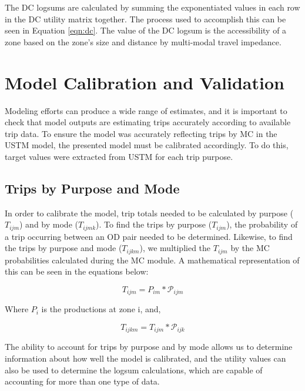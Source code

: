The DC logsums are calculated by summing the exponentiated values in each row in the DC utility matrix
together. The process used to accomplish this can be seen
in Equation \ref{eqn:dc}. The value of the DC logsum is the accessibility of
a zone based on the zone's size and distance by multi-modal travel impedance.


\section{Model Calibration and Validation}

Modeling efforts can produce a wide range of estimates, and it is important to
check that model outputs are estimating trips accurately according to available trip data.
To ensure the model was accurately reflecting trips by MC in the USTM model,
the presented model  must be
calibrated accordingly. To do this, target values were extracted from
USTM for each trip purpose.

\subsection{Trips by Purpose and Mode}

In order to calibrate the model, trip totals needed to be calculated by purpose
(\(T_{ijm}\)) and by mode (\(T_{ijmk}\)). To find the trips by purpose
(\(T_{ijm}\)), the probability of a trip occurring between an OD pair needed to
be determined. Likewise, to find the trips by purpose and mode (\(T_{ijkm}\)),
we multiplied the \(T_{ijm}\) by the MC probabilities calculated during the MC
module. A mathematical representation of this can be seen in the equations
below:

\begin{equation}
	T_{ijm} = P_{im} * \mathcal{P}_{ijm}
	\label{eqn:ij}
\end{equation}

\noindent Where $P_i$ is the productions at zone i, and,

\begin{equation}
	T_{ijkm} = T_{ijm} * \mathcal{P}_{ijk}
	\label{eqn:ijk}
\end{equation}

\noindent The ability to account for trips by purpose and by mode allows us to
determine information about how well the model is calibrated, and the utility
values can also be used to determine the logsum calculations, which are capable
of accounting for more than one type of data.


